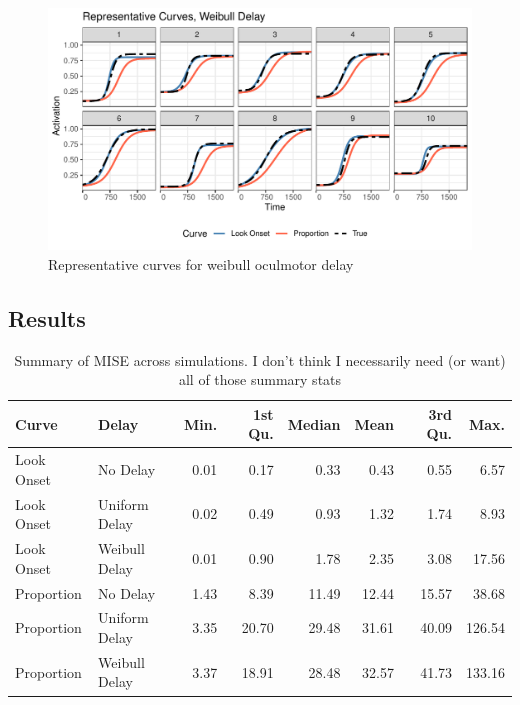 \documentclass{article}
\begin{document}
\begin{figure}[H]
\centering
\includegraphics{rep_curves_weibull_delay.pdf}
\caption{Representative curves for weibull oculmotor delay}
\label{fig:rep_curves_weibull_delay}
\end{figure}

\subsection{Results}

\begin{table}[H]
\centering
\begin{tabular}{llrrrrrr}
  \hline
Curve & Delay & Min. & 1st Qu. & Median & Mean & 3rd Qu. & Max. \\ 
  \hline
Look Onset & No Delay & 0.01 & 0.17 & 0.33 & 0.43 & 0.55 & 6.57 \\ 
  Look Onset & Uniform Delay & 0.02 & 0.49 & 0.93 & 1.32 & 1.74 & 8.93 \\ 
  Look Onset & Weibull Delay & 0.01 & 0.90 & 1.78 & 2.35 & 3.08 & 17.56 \\ 
  Proportion & No Delay & 1.43 & 8.39 & 11.49 & 12.44 & 15.57 & 38.68 \\ 
  Proportion & Uniform Delay & 3.35 & 20.70 & 29.48 & 31.61 & 40.09 & 126.54 \\ 
  Proportion & Weibull Delay & 3.37 & 18.91 & 28.48 & 32.57 & 41.73 & 133.16 \\ 
   \hline
\end{tabular}
\caption{Summary of MISE across simulations. I don't think I necessarily need (or want) all of those summary stats}
\label{tab:mise_sims}
\end{table}
\end{document}
